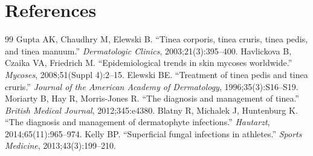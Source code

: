\section*{References}
\begin{thebibliography}{99}
 Gupta AK, Chaudhry M, Elewski B. ``Tinea corporis, tinea cruris, tinea pedis, and tinea manuum.'' \textit{Dermatologic Clinics}, 2003;21(3):395--400.
 Havlickova B, Czaika VA, Friedrich M. ``Epidemiological trends in skin mycoses worldwide.'' \textit{Mycoses}, 2008;51(Suppl 4):2--15.
 Elewski BE. ``Treatment of tinea pedis and tinea cruris.'' \textit{Journal of the American Academy of Dermatology}, 1996;35(3):S16--S19.
 Moriarty B, Hay R, Morris-Jones R. ``The diagnosis and management of tinea.'' \textit{British Medical Journal}, 2012;345:e4380.
 Blatny R, Michalek J, Huntenburg K. ``The diagnosis and management of dermatophyte infections.'' \textit{Hautarzt}, 2014;65(11):965--974.
 Kelly BP. ``Superficial fungal infections in athletes.'' \textit{Sports Medicine}, 2013;43(3):199--210.

\end{thebibliography}
